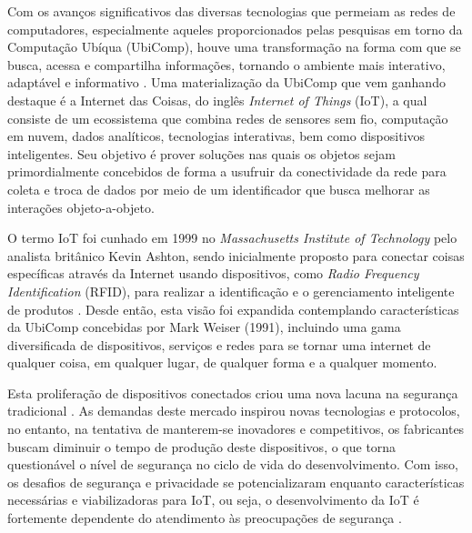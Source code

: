 \documentclass[tid,table]{texufpel} %
\begin{document}
Com os avanços significativos das diversas tecnologias que permeiam as redes de computadores, especialmente aqueles proporcionados pelas pesquisas em torno da Computação Ubíqua (UbiComp), houve uma transformação na forma com que se busca, acessa e compartilha informações, tornando o ambiente mais interativo, adaptável e informativo \cite{tweneboah17}. Uma materialização da UbiComp que vem ganhando destaque é a Internet das Coisas, do inglês \textit{Internet of Things} (IoT), a qual consiste de um ecossistema que combina redes de sensores sem fio, computação em nuvem, dados analíticos, tecnologias interativas, bem como dispositivos inteligentes. Seu objetivo é prover soluções nas quais os objetos sejam primordialmente concebidos de forma a usufruir da conectividade da rede para coleta e troca de dados por meio de um identificador que busca melhorar as interações objeto-a-objeto. 

O termo IoT foi cunhado em 1999 no \textit{Massachusetts Institute of Technology} pelo analista britânico Kevin Ashton, sendo inicialmente proposto para conectar coisas específicas através da Internet usando dispositivos, como \textit{Radio Frequency Identification} (RFID), para realizar a identificação e o gerenciamento inteligente de produtos \cite{ashton09}. Desde então, esta visão foi expandida contemplando características da UbiComp concebidas por Mark Weiser (1991)\nocite{weiser91}, incluindo uma gama diversificada de dispositivos, serviços e redes para se tornar uma internet de qualquer coisa, em qualquer lugar, de qualquer forma e a qualquer momento. 

Esta proliferação de dispositivos conectados criou uma nova lacuna na segurança tradicional \cite{sans17}. As demandas deste mercado inspirou novas tecnologias e protocolos, no entanto, na tentativa de manterem-se inovadores e competitivos, os fabricantes buscam diminuir o tempo de produção deste dispositivos, o que torna questionável o nível de segurança no ciclo de vida do desenvolvimento. Com isso, os desafios de segurança e privacidade se potencializaram enquanto características necessárias e viabilizadoras para IoT, ou seja, o desenvolvimento da IoT é fortemente dependente do atendimento às preocupações de segurança \cite{sicari15}.
\end{document}
